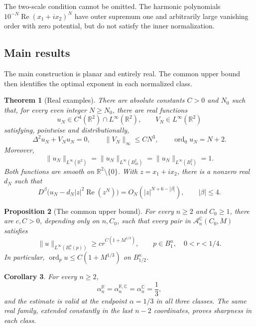 \documentclass[11pt,twoside,leqno]{article}
\numberwithin{equation}{section}
\newtheorem{theorem}{Theorem}[section]
\newtheorem{proposition}[theorem]{Proposition}
\newtheorem{corollary}[theorem]{Corollary}
\theoremstyle{definition}
\theoremstyle{remark}
\newcommand{\R}{\mathbb R}
\newcommand{\C}{\mathbb C}
\newcommand{\ord}{\operatorname{ord}}
\begin{document}
The two-scale condition cannot be omitted. The harmonic polynomials
$10^{-N}\operatorname{Re}(x_1+ix_2)^N$ have outer supremum one and
arbitrarily large vanishing order with zero potential, but do not
satisfy the inner normalization.

\subsection{Main results}

The main construction is planar and entirely real. The common upper
bound then identifies the optimal exponent in each normalized class.

\begin{theorem}[Real examples]\label{thm:real}
There are absolute constants $C>0$ and $N_0$ such that, for every even
integer $N\ge N_0$, there are real functions
\[
 u_N\in C^4(\R^2)\cap L^\infty(\R^2),\qquad
 V_N\in L^\infty(\R^2)
\]
satisfying, pointwise and distributionally,
\begin{equation}\label{eq:family}
 \Delta^2u_N+V_Nu_N=0,\qquad
 \|V_N\|_\infty\le CN^3,\qquad \ord_0u_N=N+2.
\end{equation}
Moreover,
\begin{equation}\label{eq:normalization}
 \|u_N\|_{L^\infty(\R^2)}
 =\|u_N\|_{L^\infty(B_{10}^2)}
 =\|u_N\|_{L^\infty(B_1^2)}=1.
\end{equation}
Both functions are smooth on $\R^2\setminus\{0\}$. With
$z=x_1+ix_2$, there is a nonzero real $d_N$ such that
\begin{equation}\label{eq:jet}
 D^\beta\bigl(u_N-d_N|z|^2\operatorname{Re}(z^N)\bigr)
 =O_N(|z|^{N+6-|\beta|}),\qquad |\beta|\le4.
\end{equation}
\end{theorem}

\begin{proposition}[The common upper bound]\label{prop:upper}
For every $n\ge2$ and $C_0\ge1$, there are $c,C>0$, depending only
on $n,C_0$, such that every pair in $\mathcal A_n^{\C}(C_0,M)$ satisfies
\begin{equation}\label{eq:lower-bound}
 \|u\|_{L^\infty(B_r^n(p))}
 \ge cr^{C(1+M^{1/3})},\qquad p\in B_1^n,\quad0<r<1/4.
\end{equation}
In particular, $\ord_pu\le C(1+M^{1/3})$ on $B_{1/2}^n$.
\end{proposition}

\begin{corollary}\label{cor:sharp}
For every $n\ge2$,
\[
 \alpha_n^{\R}=\alpha_n^{\R,\C}=\alpha_n^{\C}=\frac13,
\]
and the estimate is valid at the endpoint $\alpha=1/3$ in all three
classes. The same real family, extended constantly in the last $n-2$
coordinates, proves sharpness in each class.
\end{corollary}
\end{document}
